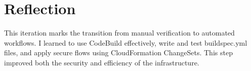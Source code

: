 \documentclass{article}
\begin{document}
\section{Reflection}
This iteration marks the transition from manual verification to automated workflows. I learned to use CodeBuild effectively, write and test buildspec.yml files, and apply secure flows using CloudFormation ChangeSets. This step improved both the security and efficiency of the infrastructure.
\end{document}
